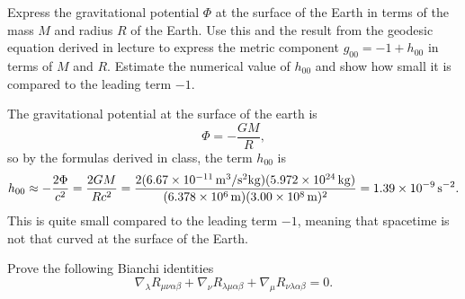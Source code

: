 \documentclass{../../templates/lkx_pset}
\begin{document}
\begin{problem}{3}
Express the gravitational potential $\Phi$ at the surface of the Earth in terms of the mass $M$ and radius $R$ of the Earth. Use this and the result from the geodesic equation derived in lecture to express the metric component $g_{00} = -1 + h_{00}$ in terms of $M$ and $R$. Estimate the numerical value of $h_{00}$ and show how small it is compared to the leading term $-1$.
\end{problem}

\begin{solution}
	The gravitational potential at the surface of the earth is
	\[
		\Phi = -\frac{GM}{R},
	\]
	so by the formulas derived in class, the term $h_{00}$ is
	\[
		h_{00} \approx -\frac{2\Phi}{c^2} = \frac{2GM}{Rc^2} = \frac{2(\Gsi{6.67e-11})(\kgsi{5.972e24})}{(\msi{6.378e6})(\msi{3.00e8})^2}=\psssi{1.39e-9}.
	\]
	This is quite small compared to the leading term $-1$, meaning that spacetime is not that curved at the surface of the Earth.
\end{solution}

\begin{problem}{4}
Prove the following Bianchi identities
\[
	\nabla_\lambda R_{\mu\nu\alpha\beta} + \nabla_\nu R_{\lambda\mu\alpha\beta} + \nabla_\mu R_{\nu\lambda\alpha\beta} = 0.
\]
\end{problem}
\end{document}
